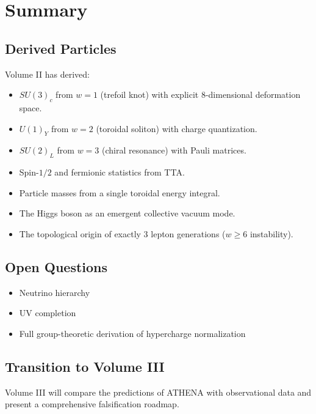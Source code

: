 \documentclass[12pt,oneside]{book}
\begin{document}
\chapter{Summary}

\section{Derived Particles}

Volume II has derived:
\begin{itemize}
    \item $SU(3)_c$ from $w=1$ (trefoil knot) with explicit 8-dimensional deformation space.
    \item $U(1)_Y$ from $w=2$ (toroidal soliton) with charge quantization.
    \item $SU(2)_L$ from $w=3$ (chiral resonance) with Pauli matrices.
    \item Spin-$1/2$ and fermionic statistics from TTA.
    \item Particle masses from a single toroidal energy integral.
    \item The Higgs boson as an emergent collective vacuum mode.
    \item The topological origin of exactly 3 lepton generations ($w \geq 6$ instability).
\end{itemize}

\section{Open Questions}

\begin{itemize}
    \item Neutrino hierarchy
    \item UV completion
    \item Full group-theoretic derivation of hypercharge normalization
\end{itemize}

\section{Transition to Volume III}

Volume III will compare the predictions of ATHENA with observational data and present a comprehensive falsification roadmap.
\end{document}

